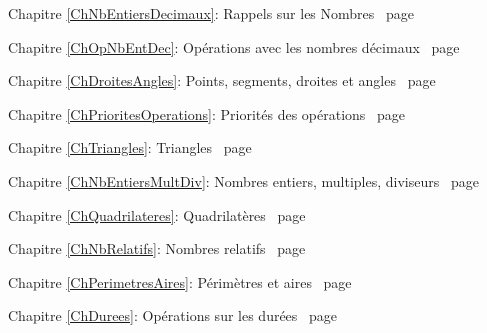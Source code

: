 \begin{commentaire}


\textcolor{PartieFonction}{\PrerequisTitleFont 
Chapitre \ref{ChNbEntiersDecimaux}: Rappels sur les Nombres \dotfill\ page\pageref{ChNbEntiersDecimaux}}

\vspace{2em}

\textcolor{PartieFonction}{\PrerequisTitleFont 
Chapitre \ref{ChOpNbEntDec}: Opérations avec les nombres décimaux \dotfill\ page \pageref{ChOpNbEntDec}}

\vspace{2em}

\textcolor{PartieGeometrie}{\PrerequisTitleFont 
Chapitre \ref{ChDroitesAngles}: Points, segments, droites et angles \dotfill\ page \pageref{ChDroitesAngles}}

\vspace{2em}

\textcolor{PartieFonction}{\PrerequisTitleFont 
Chapitre \ref{ChPrioritesOperations}: Priorités des opérations \dotfill\ page \pageref{ChPrioritesOperations}}

\vspace{2em}

\textcolor{PartieGeometrie}{\PrerequisTitleFont 
Chapitre \ref{ChTriangles}: Triangles \dotfill\ page \pageref{ChTriangles}}

\vspace{2em}

\textcolor{PartieFonction}{\PrerequisTitleFont 
Chapitre \ref{ChNbEntiersMultDiv}: Nombres entiers, multiples, diviseurs \dotfill\ page \pageref{ChNbEntiersMultDiv}}

\vspace{2em}

\textcolor{PartieGeometrie}{\PrerequisTitleFont 
Chapitre \ref{ChQuadrilateres}: Quadrilatères \dotfill\ page \pageref{ChQuadrilateres}}

\vspace{2em}

\textcolor{PartieFonction}{\PrerequisTitleFont 
Chapitre \ref{ChNbRelatifs}: Nombres relatifs \dotfill\ page \pageref{ChNbRelatifs}}

\vspace{2em}

\textcolor{PartieGeometrie}{\PrerequisTitleFont 
Chapitre \ref{ChPerimetresAires}: Périmètres et aires \dotfill\ page \pageref{ChPerimetresAires}}

\vspace{2em}
\textcolor{PartieFonction}{\PrerequisTitleFont 
Chapitre \ref{ChDurees}: Opérations sur les durées \dotfill\ page\pageref{ChDurees}}

\end{commentaire}